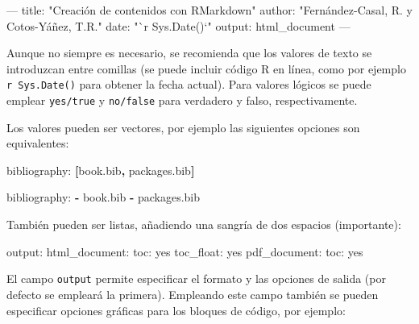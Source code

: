 \documentclass[]{book}
\newenvironment{Shaded}{\begin{snugshade}}{\end{snugshade}}
\newcommand{\KeywordTok}[1]{\textcolor[rgb]{0.13,0.29,0.53}{\textbf{#1}}}
\newcommand{\StringTok}[1]{\textcolor[rgb]{0.31,0.60,0.02}{#1}}
\newcommand{\OtherTok}[1]{\textcolor[rgb]{0.56,0.35,0.01}{#1}}
\newcommand{\FunctionTok}[1]{\textcolor[rgb]{0.00,0.00,0.00}{#1}}
\newcommand{\AttributeTok}[1]{\textcolor[rgb]{0.77,0.63,0.00}{#1}}
\newcommand{\NormalTok}[1]{#1}
\theoremstyle{definition}
\theoremstyle{definition}
\theoremstyle{definition}
\theoremstyle{remark}
\begin{document}
\begin{Shaded}
\begin{Highlighting}[]
\OtherTok{---}
\FunctionTok{title:}\AttributeTok{ }\StringTok{"Creación de contenidos con RMarkdown"}
\FunctionTok{author:}\AttributeTok{ }\StringTok{"Fernández-Casal, R. y Cotos-Yáñez, T.R."}
\FunctionTok{date:}\AttributeTok{ }\StringTok{"`r Sys.Date()`"}
\FunctionTok{output:}\AttributeTok{ html_document}
\OtherTok{---}
\end{Highlighting}
\end{Shaded}

Aunque no siempre es necesario, se recomienda que los valores de texto
se introduzcan entre comillas (se puede incluir código R en línea, como
por ejemplo \texttt{\textasciigrave{}r\ Sys.Date()\textasciigrave{}}
para obtener la fecha actual). Para valores lógicos se puede emplear
\texttt{yes/true} y \texttt{no/false} para verdadero y falso,
respectivamente.

Los valores pueden ser vectores, por ejemplo las siguientes opciones son
equivalentes:

\begin{Shaded}
\begin{Highlighting}[]
\FunctionTok{bibliography:}\AttributeTok{ }\KeywordTok{[}\NormalTok{book.bib}\KeywordTok{,}\NormalTok{ packages.bib}\KeywordTok{]}
\end{Highlighting}
\end{Shaded}

\begin{Shaded}
\begin{Highlighting}[]
\FunctionTok{bibliography:}
\KeywordTok{-}\NormalTok{ book.bib}
\KeywordTok{-}\NormalTok{ packages.bib}
\end{Highlighting}
\end{Shaded}

También pueden ser listas, añadiendo una sangría de dos espacios
(importante):

\begin{Shaded}
\begin{Highlighting}[]
\FunctionTok{output:}
  \FunctionTok{html_document:}
    \FunctionTok{toc:}\AttributeTok{ yes}
    \FunctionTok{toc_float:}\AttributeTok{ yes}
  \FunctionTok{pdf_document:}
    \FunctionTok{toc:}\AttributeTok{ yes}
\end{Highlighting}
\end{Shaded}

El campo \texttt{output} permite especificar el formato y las opciones
de salida (por defecto se empleará la primera). Empleando este campo
también se pueden especificar opciones gráficas para los bloques de
código, por ejemplo:
\end{document}
